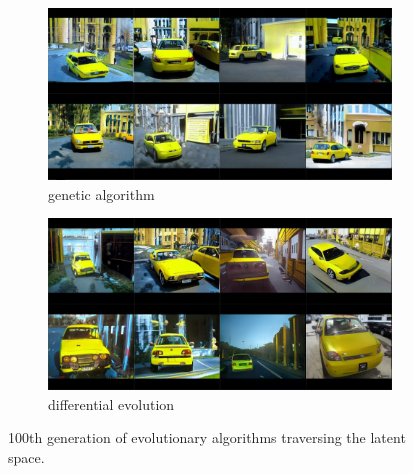 \documentclass[12pt,a4paper,openany]{book}
\begin{document}
\begin{figure}[H]
\centering
\begin{subfigure}[b]{1.0\textwidth}
   \includegraphics[width=1\linewidth]{GA_yellowcar_100.PNG}
   \caption{genetic algorithm}
   \label{fig:Ng1} 
\end{subfigure}

\begin{subfigure}[b]{1.0\textwidth}
   \includegraphics[width=1\linewidth]{DE_yellowcar_100.PNG}
   \caption{differential evolution}
   \label{fig:Ng2}
\end{subfigure}

\caption[Two numerical solutions]{100th generation of evolutionary algorithms traversing the latent space.}
\end{figure}

\newpage
\end{document}
